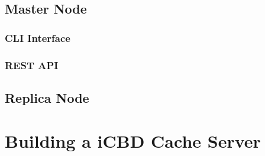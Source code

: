 \subsection{Master Node}
\label{sub:rep_master_node}

\subsubsection{CLI Interface}
\label{subsub:rep_cli_interface}

\subsubsection{REST API}
\label{subsub:rep_restapi}

\subsection{Replica Node}
\label{sub:rep_replica_node}






\section{Building a iCBD Cache Server}
\label{sec:cache_server}



